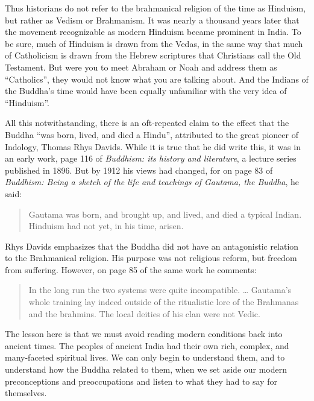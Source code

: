 \documentclass[12pt,openany]{book}%
\begin{document}
Thus historians do not refer to the brahmanical religion of the time as Hinduism, but rather as Vedism or Brahmanism. It was nearly a thousand years later that the movement recognizable as modern Hinduism became prominent in India. To be sure, much of Hinduism is drawn from the Vedas, in the same way that much of Catholicism is drawn from the Hebrew scriptures that Christians call the Old Testament. But were you to meet Abraham or Noah and address them as “Catholics”, they would not know what you are talking about. And the Indians of the Buddha’s time would have been equally unfamiliar with the very idea of “Hinduism”.

All this notwithstanding, there is an oft-repeated claim to the effect that the Buddha “was born, lived, and died a Hindu”, attributed to the great pioneer of Indology, Thomas Rhys Davids. While it is true that he did write this, it was in an early work, page 116 of \textit{Buddhism: its history and literature}, a lecture series published in 1896. But by 1912 his views had changed, for on page 83 of \textit{Buddhism: Being a sketch of the life and teachings of Gautama, the Buddha}, he said:

\begin{quotation}%
Gautama was born, and brought up, and lived, and died a typical Indian. Hinduism had not yet, in his time, arisen.

%
\end{quotation}

Rhys Davids emphasizes that the Buddha did not have an antagonistic relation to the Brahmanical religion. His purpose was not religious reform, but freedom from suffering. However, on page 85 of the same work he comments:

\begin{quotation}%
In the long run the two systems were quite incompatible. … Gautama’s whole training lay indeed outside of the ritualistic lore of the Brahmanas and the brahmins. The local deities of his clan were not Vedic.

%
\end{quotation}

The lesson here is that we must avoid reading modern conditions back into ancient times. The peoples of ancient India had their own rich, complex, and many-faceted spiritual lives. We can only begin to understand them, and to understand how the Buddha related to them, when we set aside our modern preconceptions and preoccupations and listen to what they had to say for themselves.
\end{document}
